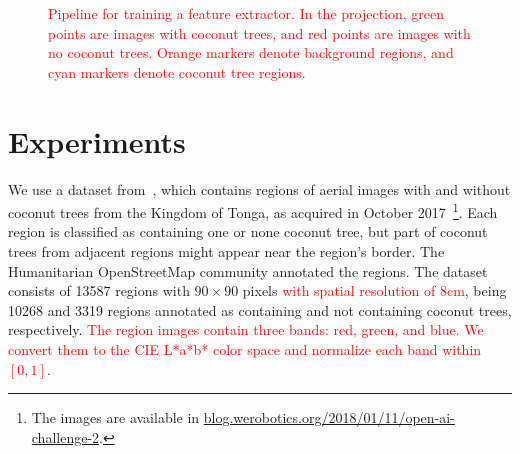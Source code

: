 \documentclass[journal, twoside]{IEEEtran}
\begin{document}
\begin{figure}
\begin{center}
  \end{center}
  \caption{\textcolor{red}{Pipeline for training a feature extractor. In the projection, green points are images with coconut trees, and red points are images with no coconut trees. Orange markers denote background regions, and cyan markers denote coconut tree regions.}}
  \label{fig:pipeline-xtractor}
\end{figure}

\section{Experiments}

We use a dataset from~\cite{8899005}, which contains regions of aerial images with and without coconut trees from the Kingdom of Tonga, as acquired in October 2017~\footnote{The images are available in \url{blog.werobotics.org/2018/01/11/open-ai-challenge-2}.}. Each region is classified as containing one or none coconut tree, but part of coconut trees from adjacent regions might appear near the region's border. The Humanitarian OpenStreetMap community annotated the regions. The dataset consists of 13587 regions with $90 \times 90$ pixels \textcolor{red}{with spatial resolution of $8$\si{\centi\metre}}, being 10268 and 3319 regions annotated as containing and not containing coconut trees, respectively. \textcolor{red}{The region images contain three bands: red, green, and blue. We convert them to the CIE L*a*b* color space and normalize each band within $[0,1]$}.
\end{document}

